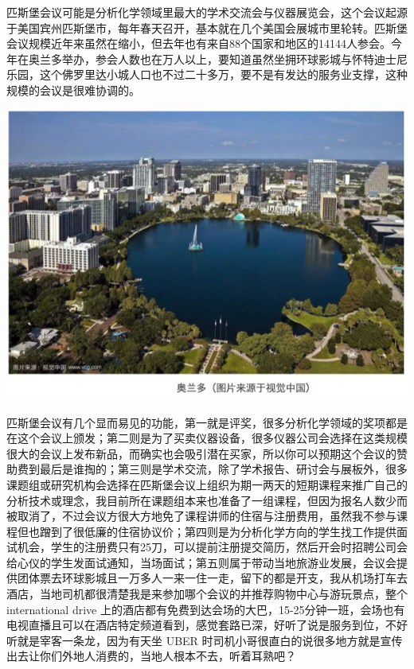 \documentclass[]{book}
\begin{document}
匹斯堡会议可能是分析化学领域里最大的学术交流会与仪器展览会，这个会议起源于美国宾州匹斯堡市，每年春天召开，基本就在几个美国会展城市里轮转。匹斯堡会议规模近年来虽然在缩小，但去年也有来自88个国家和地区的14144人参会。今年在奥兰多举办，参会人数也在万人以上，要知道虽然坐拥环球影城与怀特迪士尼乐园，这个佛罗里达小城人口也不过二十多万，要不是有发达的服务业支撑，这种规模的会议是很难协调的。

\includegraphics[width=8.33in]{images/pittcon1}

匹斯堡会议有几个显而易见的功能，第一就是评奖，很多分析化学领域的奖项都是在这个会议上颁发；第二则是为了买卖仪器设备，很多仪器公司会选择在这类规模很大的会议上发布新品，而确实也会吸引潜在买家，所以你可以预期这个会议的赞助费到最后是谁掏的；第三则是学术交流，除了学术报告、研讨会与展板外，很多课题组或研究机构会选择在匹斯堡会议上组织为期一两天的短期课程来推广自己的分析技术或理念，我目前所在课题组本来也准备了一组课程，但因为报名人数少而被取消了，不过会议方很大方地免了课程讲师的住宿与注册费用，虽然我不参与课程但也蹭到了很低廉的住宿协议价；第四则是为分析化学方向的学生找工作提供面试机会，学生的注册费只有25刀，可以提前注册提交简历，然后开会时招聘公司会给心仪的学生发面试通知，当场面试；第五则属于带动当地旅游业发展，会议会提供团体票去环球影城且一万多人一来一住一走，留下的都是开支，我从机场打车去酒店，当地司机都很清楚我是来参加哪个会议的并推荐购物中心与游玩景点，整个 international drive 上的酒店都有免费到达会场的大巴，15-25分钟一班，会场也有电视直播且可以在酒店特定频道看到，感觉套路已深，好听了说是服务到位，不好听就是宰客一条龙，因为有天坐 UBER 时司机小哥很直白的说很多地方就是宣传出去让你们外地人消费的，当地人根本不去，听着耳熟吧？
\end{document}
